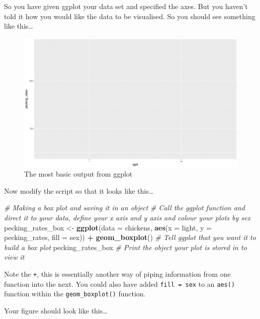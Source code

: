 \documentclass[
]{book}
\newenvironment{Shaded}{\begin{snugshade}}{\end{snugshade}}
\newcommand{\AttributeTok}[1]{\textcolor[rgb]{0.13,0.29,0.53}{#1}}
\newcommand{\CommentTok}[1]{\textcolor[rgb]{0.56,0.35,0.01}{\textit{#1}}}
\newcommand{\FunctionTok}[1]{\textcolor[rgb]{0.13,0.29,0.53}{\textbf{#1}}}
\newcommand{\NormalTok}[1]{#1}
\newcommand{\OtherTok}[1]{\textcolor[rgb]{0.56,0.35,0.01}{#1}}
\newcommand{\SpecialCharTok}[1]{\textcolor[rgb]{0.81,0.36,0.00}{\textbf{#1}}}
\begin{document}
So you have given ggplot your data set and specified the axes. But you haven't told it how you would like the data to be visualised. So you should see something like this\ldots{}

\begin{figure}
\includegraphics[width=0.9\linewidth]{figures/pecking_rates_1} \caption{The most basic output from ggplot}\label{fig:unnamed-chunk-77}
\end{figure}

Now modify the script so that it looks like this\ldots{}

\begin{Shaded}
\begin{Highlighting}[]
\CommentTok{\# Making a box plot and saving it in an object}
\CommentTok{\# Call the ggplot function and direct it to your data, define your x axis and y axis and colour your plots by sex}
\NormalTok{pecking\_rates\_box }\OtherTok{\textless{}{-}} \FunctionTok{ggplot}\NormalTok{(}\AttributeTok{data =}\NormalTok{ chickens, }\FunctionTok{aes}\NormalTok{(}\AttributeTok{x =}\NormalTok{ light, }\AttributeTok{y =}\NormalTok{ pecking\_rates, }\AttributeTok{fill =}\NormalTok{ sex)) }\SpecialCharTok{+}
  \FunctionTok{geom\_boxplot}\NormalTok{() }\CommentTok{\# Tell ggplot that you want it to build a box plot}
\NormalTok{pecking\_rates\_box }\CommentTok{\# Print the object your plot is stored in to view it}
\end{Highlighting}
\end{Shaded}

Note the \texttt{+}, this is essentially another way of piping information from one function into the next. You could also have added \texttt{fill\ =\ sex} to an \texttt{aes()} function within the \texttt{geom\_boxplot()} function.

Your figure should look like this\ldots{}
\end{document}
